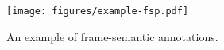 \begin{figure}
  \centering
  \texttt{[image: figures/example-fsp.pdf]}
  
  \caption{\label{fig:fsp-example} An example of frame-semantic annotations.}
\end{figure}